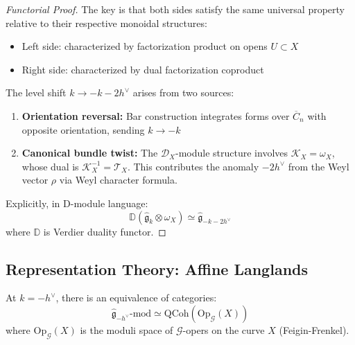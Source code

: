 \begin{proof}[Functorial Proof]
The key is that both sides satisfy the same universal property relative to their respective monoidal structures:
\begin{itemize}
\item Left side: characterized by factorization product on opens $U \subset X$
\item Right side: characterized by dual factorization coproduct
\end{itemize}

The level shift $k \to -k-2h^\vee$ arises from two sources:
\begin{enumerate}
\item \textbf{Orientation reversal:} Bar construction integrates forms over $\overline{C}_n$ with opposite orientation, sending $k \to -k$
\item \textbf{Canonical bundle twist:} The $\mathcal{D}_X$-module structure involves $\mathcal{K}_X = \omega_X$, whose dual is $\mathcal{K}_X^{-1} = \mathcal{T}_X$. This contributes the anomaly $-2h^\vee$ from the Weyl vector $\rho$ via Weyl character formula.
\end{enumerate}

Explicitly, in D-module language:
$$\mathbb{D}(\widehat{\mathfrak{g}}_k \otimes \omega_X) \simeq \widehat{\mathfrak{g}}_{-k-2h^\vee}$$
where $\mathbb{D}$ is Verdier duality functor.
\end{proof}

\subsection{Representation Theory: Affine Langlands}

\begin{theorem}
At $k = -h^\vee$, there is an equivalence of categories:
$$\widehat{\mathfrak{g}}_{-h^\vee}\text{-mod} \simeq \text{QCoh}(\text{Op}_{\mathcal{G}}(X))$$
where $\text{Op}_{\mathcal{G}}(X)$ is the moduli space of $\mathcal{G}$-opers on the curve $X$ (Feigin-Frenkel).
\end{theorem}

